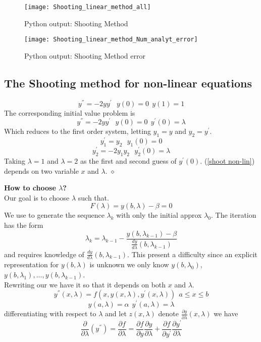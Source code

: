 \begin{figure}[H]
\centering
\texttt{[image: Shooting\_linear\_method\_all]}
\caption{Python output: Shooting Method}
\label{Shooting_method}
\end{figure}

\begin{figure}[H]
\centering
\texttt{[image: Shooting\_linear\_method\_Num\_analyt\_error]}
\caption{Python output: Shooting Method error}
\label{Shooting_method_error}
\end{figure}

\subsection{The Shooting method for non-linear equations}
\begin{example}
\[y^{''}=-2yy^{'} \ \ \ y(0)=0 \ \ y(1)=1\]
The corresponding initial value problem is 
\begin{equation}\label{shoot non-lin}
y^{''}=-2yy^{'} \ \ \ y(0)=0 \ \  y^{'}(0)=\lambda \end{equation}
Which reduces to the first order system, letting $y_1=y$ and $y_2=y^{'}$. 
\[ y^{'}_1=y_2 \ \ \ y_1(0)=0 \]
\[y^{'}_2=-2y_1y_2 \ \ \ y^{'}_2(0)=\lambda \]
Taking $\lambda =1$ and $\lambda=2$ as the first and second guess of $y^{'}(0)$.
(\ref{shoot non-lin}) depends on two variable $x$ and $\lambda$.
$\diamond$
\end{example}
\textbf{How to choose $\lambda$?}\\
Our goal is to choose $\lambda$ such that.
\[F(\lambda)=y(b,\lambda)-\beta=0 \]
We use  to generate the sequence $\lambda_k$ with only the initial approx $\lambda_0$.
The iteration has the form
\[\lambda_k=\lambda_{k-1}-\frac{y(b,\lambda_{k-1})-\beta}{\frac{dy}{d \lambda}(b,\lambda_{k-1})}\]
and requires knowledge of $\frac{dy}{d \lambda}(b,\lambda_{k-1})$.  This present
a difficulty since an explicit representation for $y(b,\lambda)$ is unknown we only know
$y(b,\lambda_0),$ $y(b,\lambda_1),...,y(b,\lambda_{k-1})$.\\
Rewriting our  we have it so that it depends on both $x$ and $\lambda$.
\[ y^{''}(x,\lambda)=f(x,y(x,\lambda),y^{'}(x,\lambda)) \ \ a\leq x \leq b\]
\[y(a,\lambda)=\alpha \ \ y^{'}(a,\lambda)=\lambda \]
differentiating with respect to $\lambda$ and let $z(x,\lambda)$ denote $\frac{\partial y}{\partial\lambda}(x,\lambda)$ we have
\[
\frac{\partial }{\partial \lambda}(y^{''}) = \frac{\partial f}{\partial \lambda}=\frac{\partial f}{\partial y}
\frac{\partial y}{\partial \lambda}+
\frac{\partial f}{\partial y^{'}}
\frac{\partial y^{'}}{\partial \lambda}
\]

